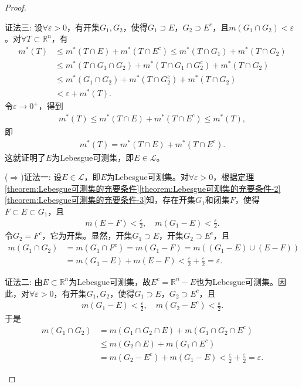 \documentclass[../../main.tex]{subfiles}%
\begin{document}
\begin{proof}
\begin{enumerate}[(1)]
{\color{blue}证法三:} 设$\forall\varepsilon>0$，有开集$G_1,G_2$，使得$G_1\supset E$，$G_2\supset E^c$，且$m(G_1\cap G_2)<\varepsilon$。对$\forall T\subset\mathbb{R}^n$，有
\begin{align*}
m^*(T) &\leqslant m^*(T\cap E)+m^*(T\cap E^c)
\leqslant m^*(T\cap G_1)+m^*(T\cap G_2) \\
&\leqslant m^*(T\cap G_1\cap G_2)+m^*(T\cap G_1\cap G_2^c)+m^*(T\cap G_2) \\
&\leqslant m^*(G_1\cap G_2)+m^*(T\cap G_2^c)+m^*(T\cap G_2) \\
&< \varepsilon+m^*(T).
\end{align*}
令$\varepsilon\to 0^+$，得到
\begin{align*}
m^*(T) \leqslant m^*(T\cap E)+m^*(T\cap E^c) \leqslant m^*(T),
\end{align*}
即
\begin{align*}
m^*(T) = m^*(T\cap E)+m^*(T\cap E^c).
\end{align*}
这就证明了$E$为Lebesgue可测集，即$E\in\mathscr{L}$。

($\Rightarrow$){\color{blue}证法一:} 设$E\in\mathscr{L}$，即$E$为Lebesgue可测集。对$\forall\varepsilon>0$，根据\hyperref[theorem:Lebesgue可测集的充要条件]{定理\ref{theorem:Lebesgue可测集的充要条件}\ref{theorem:Lebesgue可测集的充要条件-2}\ref{theorem:Lebesgue可测集的充要条件-3}}知，存在开集$G_1$和闭集$F$，使得$F\subset E\subset G_1$，且
\begin{align*}
m(E-F) < \frac{\varepsilon}{2},\quad m(G_1-E) < \frac{\varepsilon}{2}.
\end{align*}
令$G_2=F^c$，它为开集。显然，开集$G_1\supset E$，开集$G_2\supset E^c$，且
\begin{align*}
m(G_1\cap G_2) &= m(G_1\cap F^c) = m(G_1-F) = m((G_1-E)\cup(E-F)) \\
&= m(G_1-E)+m(E-F) < \frac{\varepsilon}{2}+\frac{\varepsilon}{2} = \varepsilon.
\end{align*}

{\color{blue}证法二:} 由$E\subset\mathbb{R}^n$为Lebesgue可测集，故$E^c=\mathbb{R}^n-E$也为Lebesgue可测集。因此，对$\forall\varepsilon>0$，有开集$G_1,G_2$，使得$G_1\supset E$，$G_2\supset E^c$，且
\begin{align*}
m(G_1-E) < \frac{\varepsilon}{2},\quad m(G_2-E^c) < \frac{\varepsilon}{2}.
\end{align*}
于是
\begin{align*}
m(G_1\cap G_2) &= m(G_1\cap G_2\cap E)+m(G_1\cap G_2\cap E^c) \\
&\leqslant m(G_2\cap E)+m(G_1\cap E^c) \\
&= m(G_2-E^c)+m(G_1-E) < \frac{\varepsilon}{2}+\frac{\varepsilon}{2} = \varepsilon.
\end{align*}
\end{enumerate}
\end{proof}
\end{document}

